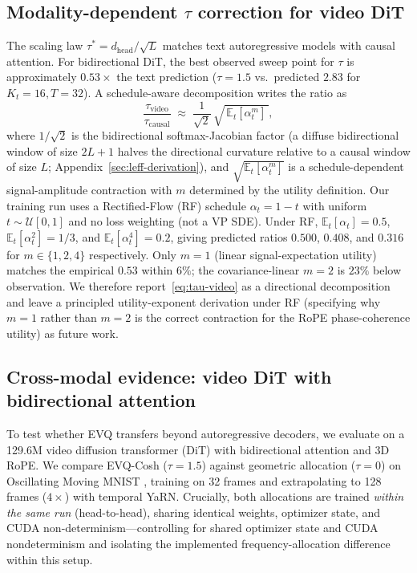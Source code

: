 \subsection{Modality-dependent \texorpdfstring{$\tau$}{tau} correction for video DiT}
\label{sec:tau-correction}

The scaling law $\tau^*=d_{\mathrm{head}}/\sqrt{L}$ matches text autoregressive models with causal attention. For bidirectional DiT, the best observed sweep point for $\tau$ is approximately $0.53\times$ the text prediction ($\tau{=}1.5$ vs.\ predicted $2.83$ for $K_t{=}16, T{=}32$). A schedule-aware decomposition writes the ratio as
\begin{equation}
\frac{\tau_{\mathrm{video}}}{\tau_{\mathrm{causal}}} \;\approx\; \frac{1}{\sqrt{2}}\,\sqrt{\,\mathbb{E}_t[\alpha_t^m]\,},
\label{eq:tau-video}
\end{equation}
where $1/\sqrt{2}$ is the bidirectional softmax-Jacobian factor (a diffuse bidirectional window of size $2L{+}1$ halves the directional curvature relative to a causal window of size $L$; Appendix~\ref{sec:leff-derivation}), and $\sqrt{\mathbb{E}_t[\alpha_t^m]}$ is a schedule-dependent signal-amplitude contraction with $m$ determined by the utility definition. Our training run uses a Rectified-Flow (RF) schedule $\alpha_t{=}1{-}t$ with uniform $t\!\sim\!\mathcal{U}[0,1]$ and no loss weighting (not a VP SDE). Under RF, $\mathbb{E}_t[\alpha_t]{=}0.5$, $\mathbb{E}_t[\alpha_t^2]{=}1/3$, and $\mathbb{E}_t[\alpha_t^4]{=}0.2$, giving predicted ratios $0.500$, $0.408$, and $0.316$ for $m\in\{1,2,4\}$ respectively. Only $m{=}1$ (linear signal-expectation utility) matches the empirical $0.53$ within $6\%$; the covariance-linear $m{=}2$ is $23\%$ below observation. We therefore report~\eqref{eq:tau-video} as a directional decomposition and leave a principled utility-exponent derivation under RF (specifying why $m{=}1$ rather than $m{=}2$ is the correct contraction for the RoPE phase-coherence utility) as future work.

\subsection{Cross-modal evidence: video DiT with bidirectional attention}


To test whether EVQ transfers beyond autoregressive decoders, we evaluate on a 129.6M video diffusion transformer (DiT) with bidirectional attention and 3D RoPE. We compare EVQ-Cosh ($\tau{=}1.5$) against geometric allocation ($\tau{=}0$) on Oscillating Moving MNIST \citep{srivastava2015unsupervised}, training on 32 frames and extrapolating to 128 frames ($4\times$) with temporal YaRN. Crucially, both allocations are trained \emph{within the same run} (head-to-head), sharing identical weights, optimizer state, and CUDA non-determinism---controlling for shared optimizer state and CUDA nondeterminism and isolating the implemented frequency-allocation difference within this setup.

